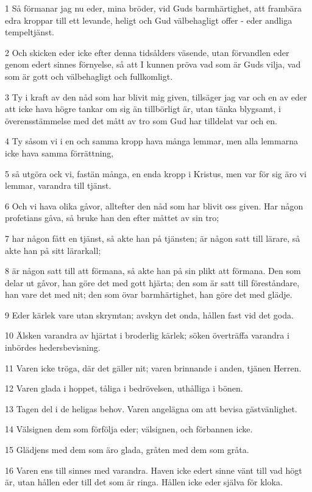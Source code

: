 \par 1 Så förmanar jag nu eder, mina bröder, vid Guds barmhärtighet, att frambära edra kroppar till ett levande, heligt och Gud välbehagligt offer - eder andliga tempeltjänst.
\par 2 Och skicken eder icke efter denna tidsålders väsende, utan förvandlen eder genom edert sinnes förnyelse, så att I kunnen pröva vad som är Guds vilja, vad som är gott och välbehagligt och fullkomligt.
\par 3 Ty i kraft av den nåd som har blivit mig given, tillsäger jag var och en av eder att icke hava högre tankar om sig än tillbörligt är, utan tänka blygsamt, i överensstämmelse med det mått av tro som Gud har tilldelat var och en.
\par 4 Ty såsom vi i en och samma kropp hava många lemmar, men alla lemmarna icke hava samma förrättning,
\par 5 så utgöra ock vi, fastän många, en enda kropp i Kristus, men var för sig äro vi lemmar, varandra till tjänst.
\par 6 Och vi hava olika gåvor, alltefter den nåd som har blivit oss given. Har någon profetians gåva, så bruke han den efter måttet av sin tro;
\par 7 har någon fått en tjänst, så akte han på tjänsten; är någon satt till lärare, så akte han på sitt lärarkall;
\par 8 är någon satt till att förmana, så akte han på sin plikt att förmana. Den som delar ut gåvor, han göre det med gott hjärta; den som är satt till föreståndare, han vare det med nit; den som övar barmhärtighet, han göre det med glädje.
\par 9 Eder kärlek vare utan skrymtan; avskyn det onda, hållen fast vid det goda.
\par 10 Älsken varandra av hjärtat i broderlig kärlek; söken överträffa varandra i inbördes hedersbevisning.
\par 11 Varen icke tröga, där det gäller nit; varen brinnande i anden, tjänen Herren.
\par 12 Varen glada i hoppet, tåliga i bedrövelsen, uthålliga i bönen.
\par 13 Tagen del i de heligas behov. Varen angelägna om att bevisa gästvänlighet.
\par 14 Välsignen dem som förfölja eder; välsignen, och förbannen icke.
\par 15 Glädjens med dem som äro glada, gråten med dem som gråta.
\par 16 Varen ens till sinnes med varandra. Haven icke edert sinne vänt till vad högt är, utan hållen eder till det som är ringa. Hållen icke eder själva för kloka.
